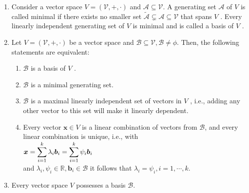 \begin{enumerate}
    \item
    \begin{definition}[Basis]
        Consider a vector space $V = (\mathcal{V}, +, \cdot)$ and $\mathcal{A} \subseteq  \mathcal{V}$. 
        A generating set $\mathcal{A}$ of $V$ is called minimal if there exists no smaller set $\tilde{\mathcal{A}} \subsetneq \mathcal{A} \subseteq \mathcal{V}$ that spans $V$ . 
        Every linearly independent generating set of $V$ is minimal and is called a basis of $V$ .
        \hfill \cite{mfml/book/mml/Deisenroth-Faisal-Ong}
    \end{definition}

    \item Let $V = (\mathcal{V}, +, \cdot)$ be a vector space and $\mathcal{B} \subseteq \mathcal{V}, \mathcal{B} \neq \phi$. Then, the following statements are equivalent:
    \hfill \cite{mfml/book/mml/Deisenroth-Faisal-Ong}
    \begin{enumerate}
        \item $\mathcal{B}$ is a basis of $V$ .
        \hfill \cite{mfml/book/mml/Deisenroth-Faisal-Ong}

        \item $\mathcal{B}$ is a minimal generating set.
        \hfill \cite{mfml/book/mml/Deisenroth-Faisal-Ong}

        \item $\mathcal{B}$ is a maximal linearly independent set of vectors in $V$ , i.e., adding any other vector to this set will make it linearly dependent.
        \hfill \cite{mfml/book/mml/Deisenroth-Faisal-Ong}

        \item Every vector $\bm{x} \in V$ is a linear combination of vectors from $\mathcal{B}$, and every linear combination is unique, i.e., with
        \\
        $
            \bm{x} 
            = \displaystyle\sum_{i=1}^k \lambda_i \bm{b}_i
            = \displaystyle\sum_{i=1}^k \psi_i \bm{b}_i
        $
        \\
        and $\lambda_i , \psi_i \in \mathbb{R}, \bm{b}_i \in \mathcal{B}$ it follows that $\lambda_i = \psi_i , i = 1, \cdots , k$.
        \hfill \cite{mfml/book/mml/Deisenroth-Faisal-Ong}
    \end{enumerate}

    \item Every vector space $V$ possesses a basis $\mathcal{B}$.
    \hfill \cite{mfml/book/mml/Deisenroth-Faisal-Ong}


\end{enumerate}
